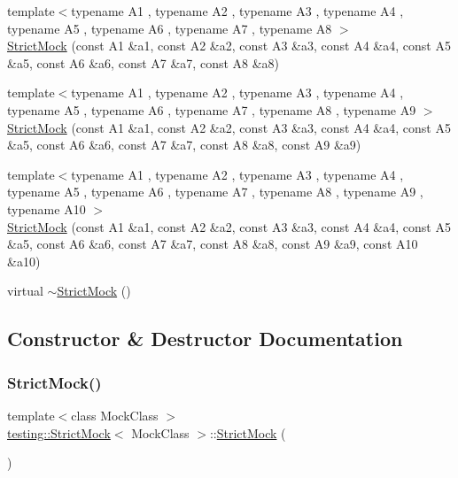 \begin{DoxyCompactItemize}
\item 
{\footnotesize template$<$typename A1 , typename A2 , typename A3 , typename A4 , typename A5 , typename A6 , typename A7 , typename A8 $>$ }\\\hyperlink{classtesting_1_1_strict_mock_aac6eaaad3e94491ada7bb43ee6149775}{Strict\+Mock} (const A1 \&a1, const A2 \&a2, const A3 \&a3, const A4 \&a4, const A5 \&a5, const A6 \&a6, const A7 \&a7, const A8 \&a8)
\item 
{\footnotesize template$<$typename A1 , typename A2 , typename A3 , typename A4 , typename A5 , typename A6 , typename A7 , typename A8 , typename A9 $>$ }\\\hyperlink{classtesting_1_1_strict_mock_a4129f247ae087d586fdb04f450422d3e}{Strict\+Mock} (const A1 \&a1, const A2 \&a2, const A3 \&a3, const A4 \&a4, const A5 \&a5, const A6 \&a6, const A7 \&a7, const A8 \&a8, const A9 \&a9)
\item 
{\footnotesize template$<$typename A1 , typename A2 , typename A3 , typename A4 , typename A5 , typename A6 , typename A7 , typename A8 , typename A9 , typename A10 $>$ }\\\hyperlink{classtesting_1_1_strict_mock_a4936b0a5622b39e974deae12ecb1430b}{Strict\+Mock} (const A1 \&a1, const A2 \&a2, const A3 \&a3, const A4 \&a4, const A5 \&a5, const A6 \&a6, const A7 \&a7, const A8 \&a8, const A9 \&a9, const A10 \&a10)
\item 
virtual \hyperlink{classtesting_1_1_strict_mock_ae22ba62955775b26c88937ee225db528}{$\sim$\+Strict\+Mock} ()
\end{DoxyCompactItemize}


\subsection{Constructor \& Destructor Documentation}
\mbox{\label{classtesting_1_1_strict_mock_ad609d745db75306dd3b360b5410923fe}} 
\subsubsection{\texorpdfstring{Strict\+Mock()}{StrictMock()}\hspace{0.1cm}{\footnotesize\ttfamily [1/11]}}
{\footnotesize\ttfamily template$<$class Mock\+Class $>$ \\
\hyperlink{classtesting_1_1_strict_mock}{testing\+::\+Strict\+Mock}$<$ Mock\+Class $>$\+::\hyperlink{classtesting_1_1_strict_mock}{Strict\+Mock} (\begin{DoxyParamCaption}{ }\end{DoxyParamCaption})\hspace{0.3cm}{\ttfamily [inline]}}

